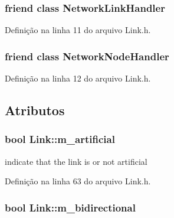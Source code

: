 \subsubsection[{Network\+Link\+Handler}]{\setlength{\rightskip}{0pt plus 5cm}friend class {\bf Network\+Link\+Handler}\hspace{0.3cm}{\ttfamily [friend]}}\label{class_link_ad10bb4cf449fbd24a72dc991deb40d8e}


Definição na linha 11 do arquivo Link.\+h.

\subsubsection[{Network\+Node\+Handler}]{\setlength{\rightskip}{0pt plus 5cm}friend class {\bf Network\+Node\+Handler}\hspace{0.3cm}{\ttfamily [friend]}}\label{class_link_acf998ac28c182cdd9130fe947302a1ff}


Definição na linha 12 do arquivo Link.\+h.



\subsection{Atributos}
\subsubsection[{m\+\_\+artificial}]{\setlength{\rightskip}{0pt plus 5cm}bool Link\+::m\+\_\+artificial\hspace{0.3cm}{\ttfamily [protected]}}\label{class_link_a4f3ac8ffe2733a7a37fe75905eaf2bf9}


indicate that the link is or not artificial 



Definição na linha 63 do arquivo Link.\+h.

\subsubsection[{m\+\_\+bidirectional}]{\setlength{\rightskip}{0pt plus 5cm}bool Link\+::m\+\_\+bidirectional\hspace{0.3cm}{\ttfamily [protected]}}\label{class_link_a2bd9a394784e7eb7759b144f19953cef}


